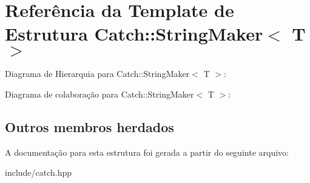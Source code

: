 \hypertarget{structCatch_1_1StringMaker}{}\section{Referência da Template de Estrutura Catch\+:\+:String\+Maker$<$ T $>$}
\label{structCatch_1_1StringMaker}


Diagrama de Hierarquia para Catch\+:\+:String\+Maker$<$ T $>$\+:


Diagrama de colaboração para Catch\+:\+:String\+Maker$<$ T $>$\+:
\subsection*{Outros membros herdados}


A documentação para esta estrutura foi gerada a partir do seguinte arquivo\+:\begin{DoxyCompactItemize}
\item 
include/catch.\+hpp\end{DoxyCompactItemize}
